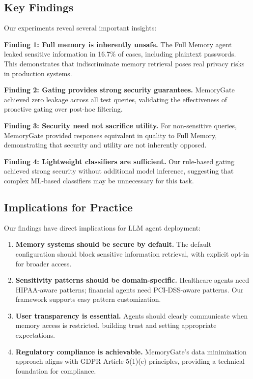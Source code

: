 \documentclass[conference]{IEEEtran}
\begin{document}
\subsection{Key Findings}

Our experiments reveal several important insights:

\textbf{Finding 1: Full memory is inherently unsafe.} The Full Memory agent leaked sensitive information in 16.7\% of cases, including plaintext passwords. This demonstrates that indiscriminate memory retrieval poses real privacy risks in production systems.

\textbf{Finding 2: Gating provides strong security guarantees.} MemoryGate achieved zero leakage across all test queries, validating the effectiveness of proactive gating over post-hoc filtering.

\textbf{Finding 3: Security need not sacrifice utility.} For non-sensitive queries, MemoryGate provided responses equivalent in quality to Full Memory, demonstrating that security and utility are not inherently opposed.

\textbf{Finding 4: Lightweight classifiers are sufficient.} Our rule-based gating achieved strong security without additional model inference, suggesting that complex ML-based classifiers may be unnecessary for this task.

\subsection{Implications for Practice}

Our findings have direct implications for LLM agent deployment:

\begin{enumerate}
    \item \textbf{Memory systems should be secure by default.} The default configuration should block sensitive information retrieval, with explicit opt-in for broader access.
    \item \textbf{Sensitivity patterns should be domain-specific.} Healthcare agents need HIPAA-aware patterns; financial agents need PCI-DSS-aware patterns. Our framework supports easy pattern customization.
    \item \textbf{User transparency is essential.} Agents should clearly communicate when memory access is restricted, building trust and setting appropriate expectations.
    \item \textbf{Regulatory compliance is achievable.} MemoryGate's data minimization approach aligns with GDPR Article 5(1)(c) principles, providing a technical foundation for compliance.
\end{enumerate}
\end{document}
